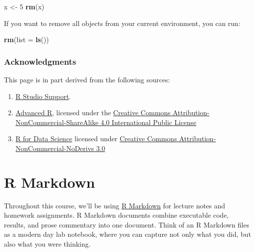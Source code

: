 \documentclass[]{book}
\newenvironment{Shaded}{\begin{snugshade}}{\end{snugshade}}
\newcommand{\KeywordTok}[1]{\textcolor[rgb]{0.13,0.29,0.53}{\textbf{#1}}}
\newcommand{\DataTypeTok}[1]{\textcolor[rgb]{0.13,0.29,0.53}{#1}}
\newcommand{\DecValTok}[1]{\textcolor[rgb]{0.00,0.00,0.81}{#1}}
\newcommand{\StringTok}[1]{\textcolor[rgb]{0.31,0.60,0.02}{#1}}
\newcommand{\NormalTok}[1]{#1}
\begin{document}
\begin{Shaded}
\begin{Highlighting}[]
\NormalTok{x <-}\StringTok{ }\DecValTok{5}
\KeywordTok{rm}\NormalTok{(x)}
\end{Highlighting}
\end{Shaded}

If you want to remove all objects from your current environment, you can
run:

\begin{Shaded}
\begin{Highlighting}[]
\KeywordTok{rm}\NormalTok{(}\DataTypeTok{list =} \KeywordTok{ls}\NormalTok{())}
\end{Highlighting}
\end{Shaded}

\subsubsection*{Acknowledgments}\label{acknowledgments}

This page is in part derived from the following sources:

\begin{enumerate}
\def\labelenumi{\arabic{enumi}.}
\item
  \href{https://support.rstudio.com/hc/en-us/articles/200484448}{R
  Studio Support}.
\item
  \href{https://adv-r.hadley.nz/}{Advanced R}, licensed under the
  \href{https://creativecommons.org/licenses/by-nc-sa/4.0/}{Creative
  Commons Attribution-NonCommercial-ShareAlike 4.0 International Public
  License}
\item
  \href{https://r4ds.had.co.nz}{R for Data Science} licensed under
  \href{https://creativecommons.org/licenses/by-nc-nd/3.0/us/}{Creative
  Commons Attribution-NonCommercial-NoDerivs 3.0}
\end{enumerate}

\hypertarget{r-markdown}{\section{R Markdown}\label{r-markdown}}

Throughout this course, we'll be using
\href{http://rmarkdown.rstudio.com\%3E}{R Markdown} for lecture notes
and homework assignments. R Markdown documents combine executable code,
results, and prose commentary into one document. Think of an R Markdown
files as a modern day lab notebook, where you can capture not only what
you did, but also what you were thinking.
\end{document}
